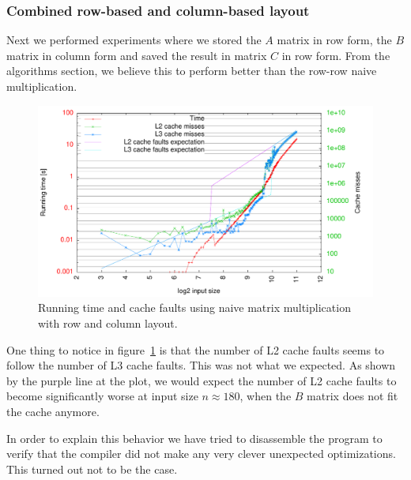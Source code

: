 \subsubsection{Combined row-based and column-based layout}
Next we performed experiments where we stored the $A$ matrix in row
form, the $B$ matrix in column form and saved the result in matrix $C$
in row form. From the algorithms section, we believe this to perform
better than the row-row naive multiplication.

\begin{figure}[h!]
  \centering
  \includegraphics[width=\textwidth]{plots/rowcol}
  \caption{Running time and cache faults using naive matrix
    multiplication with row and column layout.}
  \label{fig:rowcol}
\end{figure}

One thing to notice in figure~\ref{fig:rowcol} is that the number of
L2 cache faults seems to follow the number of L3 cache faults. This
was not what we expected. As shown by the purple line at the plot, we
would expect the number of L2 cache faults to become significantly
worse at input size $n \approx 180$, when the $B$ matrix does not fit
the cache anymore.

In order to explain this behavior we have tried to disassemble the
program to verify that the compiler did not make any very clever
unexpected optimizations. This turned out not to be the case.

